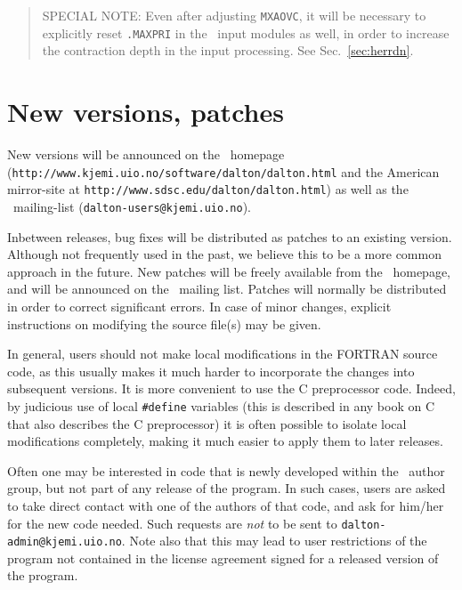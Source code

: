 \begin{quote}
SPECIAL NOTE: Even after adjusting \verb|MXAOVC|, it will be
necessary to explicitly reset \verb|.MAXPRI| in the
\her\ input modules as well, in order to increase the contraction depth
in the input processing.  See Sec.~\ref{sec:herrdn}.
\end{quote}

\section{New versions, patches}

New versions will be announced on the \dalton\
homepage\\
(\verb|http://www.kjemi.uio.no/software/dalton/dalton.html| 
and the American mirror-site at \verb|http://www.sdsc.edu/dalton/dalton.html|) 
as well
as the \dalton\ mailing-list
(\verb|dalton-users@kjemi.uio.no|).

Inbetween releases, bug fixes will be distributed as
patches to an
existing version. Although not frequently used in the past, we believe
this to be a more common approach in the future. New patches will be
freely available from the 
\dalton\ homepage, and will be announced on the \dalton\ mailing
list. Patches will normally be distributed in order to correct
significant errors. In case of minor changes, explicit
instructions on modifying the source file(s) may be given.

In general, users should not make local
modifications in the FORTRAN source code, as this usually makes it
much harder to incorporate the changes into subsequent versions.
It is more convenient to use the C preprocessor code.  Indeed, by
judicious use of local \verb|#define|\index{define} variables (this
is described in any book on C that also describes the C
preprocessor) it is often possible to isolate local
modifications completely, making it much easier
to apply them to later
releases.

Often one may be interested in code that is newly developed\index{new
code} within the
\dalton\ author group, but not part of any release of the program. In
such cases, users are asked to take direct contact with one of the
authors of that code, and ask for him/her for the new code
needed. Such requests are {\em not} to be sent to
\verb|dalton-admin@kjemi.uio.no|. Note also that this may lead to user
restrictions of the program not contained in the license agreement
signed for a released version of the program.

